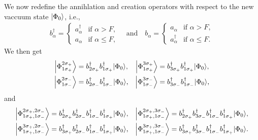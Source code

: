 We now redefine the annihlation and creation operators with respect to the new vaccuum state $\ket*{\Phi_0}$, i.e.,
\begin{align*}
    b^\dagger_\alpha =
    \begin{cases}
        a^\dagger_\alpha & \text{if } \alpha > F, \\
        a_\alpha & \text{if } \alpha \leq F,
    \end{cases}
    \quad \text{and} \quad
    b_\alpha =
    \begin{cases}
        a_\alpha & \text{if } \alpha > F, \\
        a^\dagger_\alpha & \text{if } \alpha \leq F.
    \end{cases}
\end{align*}
We then get
\begin{align*}
    \ket*{\Phi_{1\sigma_{+}}^{2\sigma_{+}}} &= b_{2\sigma_{+}}^\dagger b_{1\sigma_{+}}^\dagger \ket*{\Phi_0}, &
    \ket*{\Phi_{1\sigma_{+}}^{3\sigma_{+}}} &= b_{3\sigma_{+}}^\dagger b_{1\sigma_{+}}^\dagger \ket*{\Phi_0}, \\
    \ket*{\Phi_{1\sigma_{-}}^{2\sigma_{-}}} &= b_{2\sigma_{-}}^\dagger b_{1\sigma_{-}}^\dagger \ket*{\Phi_0}, &
    \ket*{\Phi_{1\sigma_{-}}^{3\sigma_{-}}} &= b_{3\sigma_{-}}^\dagger b_{1\sigma_{-}}^\dagger \ket*{\Phi_0},
\end{align*}
and
\begin{align*}
    \ket*{\Phi_{1\sigma_{+}, 1\sigma_{-}}^{2\sigma_{+}, 2\sigma_{-}}} &= b_{2\sigma_{+}}^\dagger b_{2\sigma_{-}}^\dagger b_{1\sigma_{-}}^\dagger b_{1\sigma_{+}}^\dagger \ket*{\Phi_0}, &
    \ket*{\Phi_{1\sigma_{+}, 1\sigma_{-}}^{2\sigma_{+}, 3\sigma_{-}}} &= b_{2\sigma_{+}}^\dagger b_{3\sigma_{-}}^\dagger b_{1\sigma_{-}}^\dagger b_{1\sigma_{+}}^\dagger \ket*{\Phi_0}, \\
    \ket*{\Phi_{1\sigma_{+}, 1\sigma_{-}}^{3\sigma_{+}, 2\sigma_{-}}} &= b_{3\sigma_{+}}^\dagger b_{2\sigma_{-}}^\dagger b_{1\sigma_{-}}^\dagger b_{1\sigma_{+}}^\dagger \ket*{\Phi_0}, &
    \ket*{\Phi_{1\sigma_{+}, 1\sigma_{-}}^{3\sigma_{+}, 3\sigma_{-}}} &= b_{3\sigma_{+}}^\dagger b_{3\sigma_{-}}^\dagger b_{1\sigma_{-}}^\dagger b_{1\sigma_{+}}^\dagger \ket*{\Phi_0}.
\end{align*}
